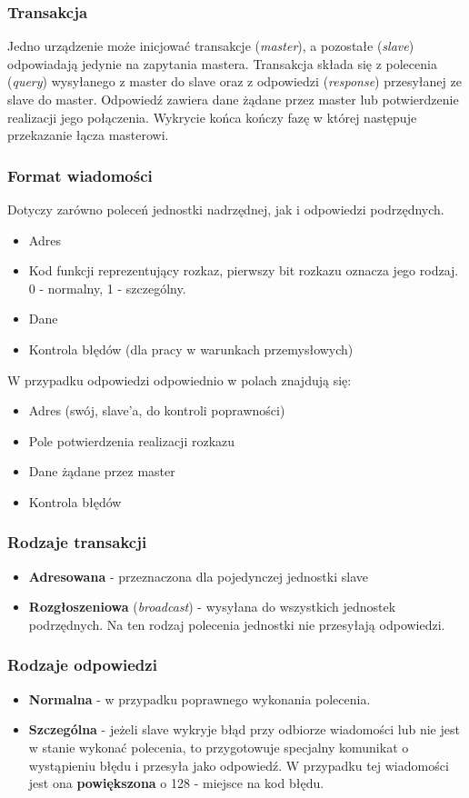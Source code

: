 		\subsubsection{Transakcja}
		Jedno urządzenie może inicjować transakcje (\emph{master}), a pozostałe (\emph{slave}) odpowiadają jedynie na zapytania mastera. Transakcja składa się z polecenia (\emph{query}) wysyłanego z master do slave oraz z odpowiedzi (\emph{response}) przesyłanej ze slave do master. Odpowiedź zawiera dane żądane przez master lub potwierdzenie realizacji jego połączenia. Wykrycie końca kończy fazę w której następuje przekazanie łącza masterowi.\\
		\subsubsection{Format wiadomości}
		Dotyczy zarówno poleceń jednostki nadrzędnej, jak i odpowiedzi podrzędnych.
		\begin{itemize}
			\item Adres
			\item Kod funkcji reprezentujący rozkaz, pierwszy bit rozkazu oznacza jego rodzaj. 0 - normalny, 1 - szczególny.
			\item Dane
			\item Kontrola błędów (dla pracy w warunkach przemysłowych)
		\end{itemize}
		W przypadku odpowiedzi odpowiednio w polach znajdują się:
		\begin{itemize}
			\item Adres (swój, slave'a, do kontroli poprawności)
			\item Pole potwierdzenia realizacji rozkazu
			\item Dane żądane przez master
			\item Kontrola błędów
		\end{itemize}
		\subsubsection{Rodzaje transakcji}
			\begin{itemize}
				\item \textbf{Adresowana} - przeznaczona dla pojedynczej jednostki slave
				\item \textbf{Rozgłoszeniowa} (\emph{broadcast}) - wysyłana do wszystkich jednostek podrzędnych. Na ten rodzaj polecenia jednostki nie przesyłają odpowiedzi.
			\end{itemize}
		\subsubsection{Rodzaje odpowiedzi}
			\begin{itemize}
				\item \textbf{Normalna} - w przypadku poprawnego wykonania polecenia.
				\item \textbf{Szczególna} - jeżeli slave wykryje błąd przy odbiorze wiadomości lub nie jest w stanie wykonać polecenia, to przygotowuje specjalny komunikat o wystąpieniu błędu i przesyła jako odpowiedź. W przypadku tej wiadomości jest ona \textbf{powiększona} o 128 - miejsce na kod błędu.
			\end{itemize}
